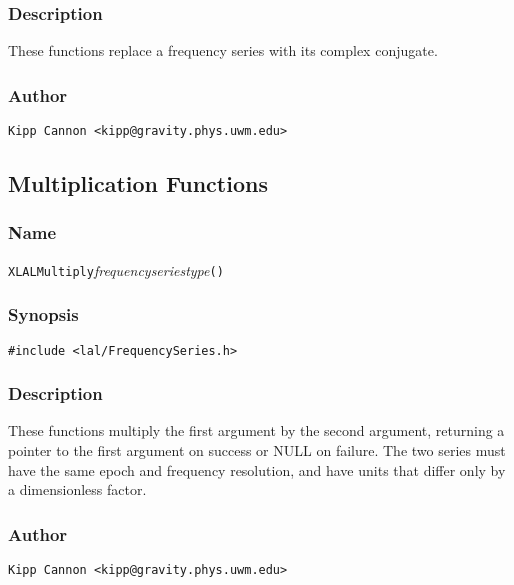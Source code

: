 \subsubsection{Description}

These functions replace a frequency series with its complex conjugate.

\subsubsection{Author}

\verb|Kipp Cannon <kipp@gravity.phys.uwm.edu>|


\subsection{Multiplication Functions}

\subsubsection{Name}

\texttt{XLALMultiply}\textit{frequencyseriestype}\texttt{()}

\subsubsection{Synopsis}

\begin{verbatim}
#include <lal/FrequencySeries.h>
\end{verbatim}


\subsubsection{Description}

These functions multiply the first argument by the second argument,
returning a pointer to the first argument on success or NULL on failure.
The two series must have the same epoch and frequency resolution, and have
units that differ only by a dimensionless factor.

\subsubsection{Author}

\verb|Kipp Cannon <kipp@gravity.phys.uwm.edu>|

